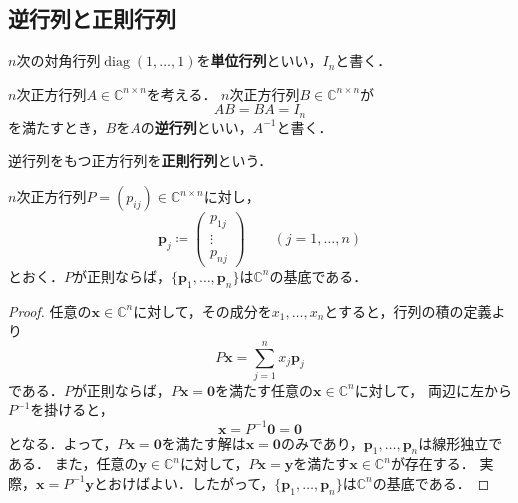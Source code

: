 \subsection{逆行列と正則行列}

\begin{defi}[単位行列]
  $n$次の対角行列$\operatorname{diag}(1,\ldots,1)$を\textbf{単位行列}といい，$I_n$と書く．
\end{defi}

\begin{defi}[逆行列]
  $n$次正方行列$A\in\mathbb C^{n\times n}$を考える．
  $n$次正方行列$B\in\mathbb C^{n\times n}$が
  \begin{equation*}
    AB=BA=I_n
  \end{equation*}
  を満たすとき，$B$を$A$の\textbf{逆行列}といい，$A^{-1}$と書く．
\end{defi}

\begin{defi}[正則行列]
  逆行列をもつ正方行列を\textbf{正則行列}という．
\end{defi}

\begin{theo}[正則行列と基底]
  \label{theo:invertible-column-basis}
  $n$次正方行列$P=(p_{ij})\in\mathbb C^{n\times n}$に対し，
  \begin{equation*}
    \bm{p}_j\coloneq
    \begin{pmatrix}
      p_{1j}\\
      \vdots\\
      p_{nj}
    \end{pmatrix}
    \qquad (j=1,\ldots,n)
  \end{equation*}
  とおく．$P$が正則ならば，$\{\bm{p}_1,\ldots,\bm{p}_n\}$は$\mathbb C^n$の基底である．
\end{theo}

\begin{proof}
  任意の$\bm{x}\in\mathbb C^n$に対して，その成分を$x_1,\ldots,x_n$とすると，行列の積の定義より
  \begin{equation*}
    P\bm{x}=\sum_{j=1}^{n}x_j\bm{p}_j
  \end{equation*}
  である．$P$が正則ならば，$P\bm{x}=\bm{0}$を満たす任意の$\bm{x}\in\mathbb C^n$に対して，
  両辺に左から$P^{-1}$を掛けると，
  \begin{equation*}
    \bm{x}=P^{-1}\bm{0}=\bm{0}
  \end{equation*}
  となる．よって，$P\bm{x}=\bm{0}$を満たす解は$\bm{x}=\bm{0}$のみであり，$\bm{p}_1,\ldots,\bm{p}_n$は線形独立である．
  また，任意の$\bm{y}\in\mathbb C^n$に対して，$P\bm{x}=\bm{y}$を満たす$\bm{x}\in\mathbb C^n$が存在する．
  実際，$\bm{x}=P^{-1}\bm{y}$とおけばよい．したがって，$\{\bm{p}_1,\ldots,\bm{p}_n\}$は$\mathbb C^n$の基底である．
\end{proof}

